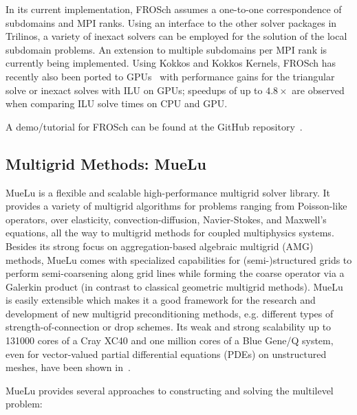 In its current implementation, FROSch assumes a one-to-one correspondence of subdomains and MPI ranks. Using an interface to the other solver packages in Trilinos, a variety of inexact solvers can be employed for the solution of the local subdomain problems. An extension to multiple subdomains per MPI rank is currently being implemented. Using Kokkos and Kokkos Kernels, FROSch has recently also been ported to GPUs~\cite{yamazaki_experimental_2023} with
performance gains for the triangular solve or inexact solves with ILU on GPUs; speedups of up to $4.8\times$ are observed when comparing ILU solve times on CPU and GPU.

A demo/tutorial for FROSch can be found at the GitHub repository~\cite{frosch_demo}.

\subsection{Multigrid Methods: MueLu}

MueLu is a flexible and scalable high-performance multigrid solver library.
It provides a variety of multigrid algorithms for problems ranging from Poisson-like operators, over elasticity, convection-diffusion, Navier-Stokes, and Maxwell's equations,
all the way to multigrid methods for coupled multiphysics systems.
Besides its strong focus on aggregation-based algebraic multigrid (AMG) methods,
MueLu comes with specialized capabilities for (semi-)structured grids to perform semi-coarsening along grid lines
while forming the coarse operator via a Galerkin product (in contrast to classical geometric multigrid methods).
MueLu is easily extensible which makes it a good framework for the research and development of new multigrid preconditioning methods, e.g. different types of strength-of-connection or drop schemes.
Its weak and strong scalability up to \num{131000} cores of a Cray XC40 and one million cores of a Blue Gene/Q system, even for vector-valued partial differential equations (PDEs) on unstructured meshes, have been shown in~\cite{Lin2017a,Thomas2019a}.

MueLu provides several approaches to constructing and solving the multilevel problem:

